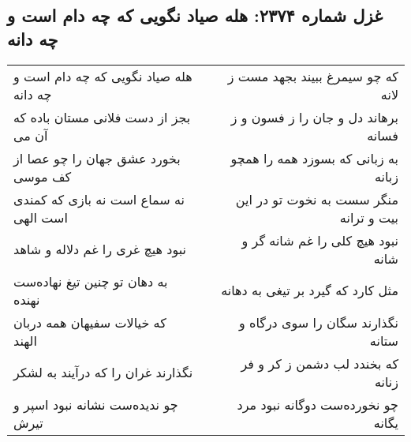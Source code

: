 \begin{center}
\section*{غزل شماره ۲۳۷۴: هله صیاد نگویی که چه دام است و چه دانه}
\label{sec:2374}
\begin{longtable}{l p{0.5cm} r}
هله صیاد نگویی که چه دام است و چه دانه
&&
که چو سیمرغ ببیند بجهد مست ز لانه
\\
بجز از دست فلانی مستان باده که آن می
&&
برهاند دل و جان را ز فسون و ز فسانه
\\
بخورد عشق جهان را چو عصا از کف موسی
&&
به زبانی که بسوزد همه را همچو زبانه
\\
نه سماع است نه بازی که کمندی است الهی
&&
منگر سست به نخوت تو در این بیت و ترانه
\\
نبود هیچ غری را غم دلاله و شاهد
&&
نبود هیچ کلی را غم شانه گر و شانه
\\
به دهان تو چنین تیغ نهاده‌ست نهنده
&&
مثل کارد که گیرد بر تیغی به دهانه
\\
که خیالات سفیهان همه دربان الهند
&&
نگذارند سگان را سوی درگاه و ستانه
\\
نگذارند غران را که درآیند به لشکر
&&
که بخندد لب دشمن ز کر و فر زنانه
\\
چو ندیده‌ست نشانه نبود اسپر و تیرش
&&
چو نخورده‌ست دوگانه نبود مرد یگانه
\\
\end{longtable}
\end{center}
